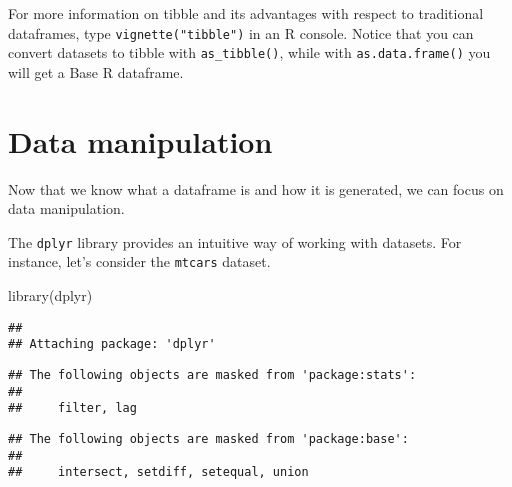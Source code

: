 \documentclass[
  oneside]{book}
\newenvironment{Shaded}{\begin{snugshade}}{\end{snugshade}}
\newcommand{\CommentTok}[1]{\textcolor[rgb]{0.56,0.35,0.01}{\textit{#1}}}
\newcommand{\FunctionTok}[1]{\textcolor[rgb]{0.00,0.00,0.00}{#1}}
\newcommand{\NormalTok}[1]{#1}
\newcommand{\OtherTok}[1]{\textcolor[rgb]{0.56,0.35,0.01}{#1}}
\newcommand{\SpecialCharTok}[1]{\textcolor[rgb]{0.00,0.00,0.00}{#1}}
\begin{document}
For more information on tibble and its advantages with respect to traditional
dataframes, type \texttt{vignette("tibble")} in an R console.
Notice that you can convert datasets to tibble with \texttt{as\_tibble()}, while
with \texttt{as.data.frame()} you will get a Base R dataframe.

\hypertarget{data-manipulation}{%
\section{Data manipulation}\label{data-manipulation}}

Now that we know what a dataframe is and how it is generated,
we can focus on data manipulation.

The \texttt{dplyr} library provides an intuitive way of working with datasets.
For instance, let's consider the \texttt{mtcars} dataset.

\begin{Shaded}
\begin{Highlighting}[]
\FunctionTok{library}\NormalTok{(dplyr)}
\end{Highlighting}
\end{Shaded}

\begin{verbatim}
## 
## Attaching package: 'dplyr'
\end{verbatim}

\begin{verbatim}
## The following objects are masked from 'package:stats':
## 
##     filter, lag
\end{verbatim}

\begin{verbatim}
## The following objects are masked from 'package:base':
## 
##     intersect, setdiff, setequal, union
\end{verbatim}

\begin{Shaded}
\end{Shaded}
\end{document}
